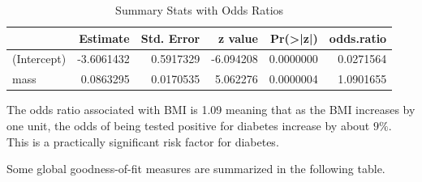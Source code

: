 \documentclass[
]{book}
\newenvironment{Shaded}{\begin{snugshade}}{\end{snugshade}}
\newcommand{\AttributeTok}[1]{\textcolor[rgb]{0.13,0.29,0.53}{#1}}
\newcommand{\CommentTok}[1]{\textcolor[rgb]{0.56,0.35,0.01}{\textit{#1}}}
\newcommand{\DocumentationTok}[1]{\textcolor[rgb]{0.56,0.35,0.01}{\textbf{\textit{#1}}}}
\newcommand{\FloatTok}[1]{\textcolor[rgb]{0.00,0.00,0.81}{#1}}
\newcommand{\FunctionTok}[1]{\textcolor[rgb]{0.13,0.29,0.53}{\textbf{#1}}}
\newcommand{\NormalTok}[1]{#1}
\newcommand{\OtherTok}[1]{\textcolor[rgb]{0.56,0.35,0.01}{#1}}
\newcommand{\SpecialCharTok}[1]{\textcolor[rgb]{0.81,0.36,0.00}{\textbf{#1}}}
\newcommand{\StringTok}[1]{\textcolor[rgb]{0.31,0.60,0.02}{#1}}
\begin{document}
\begin{Shaded}
\end{Shaded}

\begin{table}

\caption{\label{tab:unnamed-chunk-113}Summary Stats with Odds Ratios}
\centering
\begin{tabular}[t]{l|r|r|r|r|r}
\hline
  & Estimate & Std. Error & z value & Pr(>|z|) & odds.ratio\\
\hline
(Intercept) & -3.6061432 & 0.5917329 & -6.094208 & 0.0000000 & 0.0271564\\
\hline
mass & 0.0863295 & 0.0170535 & 5.062276 & 0.0000004 & 1.0901655\\
\hline
\end{tabular}
\end{table}

The odds ratio associated with BMI is 1.09 meaning that as the BMI increases by one unit, the odds of being tested positive for diabetes increase by about \(9\%\). This is a practically significant risk factor for diabetes.

Some global goodness-of-fit measures are summarized in the following table.

\begin{Shaded}
\end{Shaded}
\end{document}
